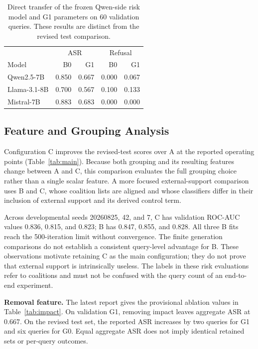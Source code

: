 \documentclass[sigconf]{acmart}
\begin{document}
\begin{table}[t]
  \caption{Direct transfer of the frozen Qwen-side risk model and G1 parameters on 60 validation queries. These results are distinct from the revised test comparison.}
  \label{tab:crossllm}
  \centering
  \small
  \setlength{\tabcolsep}{3.5pt}
  \begin{tabular}{lrrrr}
    \toprule
    & \multicolumn{2}{c}{ASR} & \multicolumn{2}{c}{Refusal} \\
    Model & B0 & G1 & B0 & G1 \\
    \midrule
    Qwen2.5-7B & 0.850 & 0.667 & 0.000 & 0.067 \\
    Llama-3.1-8B & 0.700 & 0.567 & 0.100 & 0.133 \\
    Mistral-7B & 0.883 & 0.683 & 0.000 & 0.000 \\
    \bottomrule
  \end{tabular}
\end{table}

\subsection{Feature and Grouping Analysis}
\label{sec:analysis}

Configuration C improves the revised-test scores over A at the reported operating points (Table~\ref{tab:main}). Because both grouping and its resulting features change between A and C, this comparison evaluates the full grouping choice rather than a single scalar feature. A more focused external-support comparison uses B and C, whose coalition lists are aligned and whose classifiers differ in their inclusion of external support and its derived control term.

Across developmental seeds 20260825, 42, and 7, C has validation ROC-AUC values 0.836, 0.815, and 0.823; B has 0.847, 0.855, and 0.828. All three B fits reach the 500-iteration limit without convergence. The finite generation comparisons do not establish a consistent query-level advantage for B. These observations motivate retaining C as the main configuration; they do not prove that external support is intrinsically useless. The labels in these risk evaluations refer to coalitions and must not be confused with the query count of an end-to-end experiment.

\textbf{Removal feature.} The latest report gives the provisional ablation values in Table~\ref{tab:impact}. On validation G1, removing impact leaves aggregate ASR at 0.667. On the revised test set, the reported ASR increases by two queries for G1 and six queries for G0. Equal aggregate ASR does not imply identical retained sets or per-query outcomes.
\end{document}
